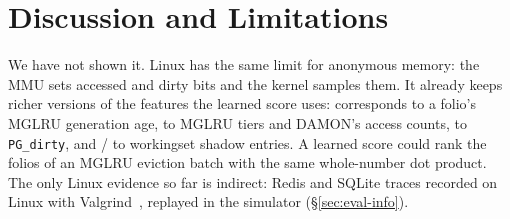 \section{Discussion and Limitations}
\label{sec:discussion}

 We have not shown it. Linux has the same limit for
anonymous memory: the MMU sets accessed and dirty bits and the kernel samples them. It
already keeps richer versions of the features the learned score uses: 
corresponds to a folio's MGLRU generation age,  to MGLRU tiers and DAMON's
access counts,  to \texttt{PG\_dirty}, and / to
workingset shadow entries. A learned score could rank the folios of an MGLRU eviction
batch with the same whole-number dot product. The only Linux evidence so far is
indirect: Redis and SQLite traces recorded on Linux with
Valgrind~\citep{nethercote2007valgrind}, replayed in the simulator (\S\ref{sec:eval-info}).

 

